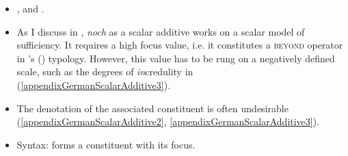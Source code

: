 \label{appendixGermanScalarAdditive}
\largerpage
\begin{itemize}
	\item \textcite[s.v. \textit{noch}]{DWDS}, \textcite[ch. 7]{Koenig1991} and \textcite{PersohnSchonNoch}.
	\item As I discuss in \textcite{PersohnSchonNoch}, \textit{noch} as a scalar additive works on a scalar model of sufficiency. It requires a high focus value, i.e. it constitutes a \textsc{beyond} operator in  \citeauthor{GastvanderAuwera2011}'s (\citeyear{GastvanderAuwera2011}) typology. However, this value has to be rung on a negatively defined scale, such as the degrees of \textit{in}credulity in (\ref{appendixGermanScalarAdditive3}).
	\item The denotation of the associated constituent is often undesirable (\ref{appendixGermanScalarAdditive2}, \ref{appendixGermanScalarAdditive3}).
	\item Syntax: forms a constituent with its focus.
\end{itemize}


